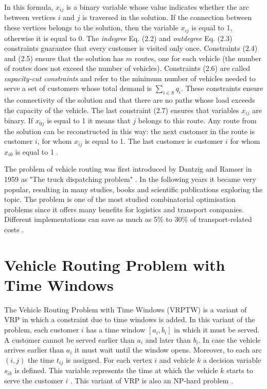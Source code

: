 \documentclass[a4paper,twoside,12pt]{book}
\begin{document}
In this formula, $x_{ij}$ is a binary variable whose value indicates whether the arc between vertices $i$ and $j$ is traversed in the solution.  
If the connection between these vertices belongs to the solution, then the variable $x_{ij}$ is equal to 1, otherwise it is equal to 0. The \textit{indegree} Eq. (2.2) and \textit{outdegree} Eq. (2.3) constraints guarantee that every customer is visited only once. Constraints (2.4) and (2.5) ensure that the solution has $m$ routes, one for each vehicle (the number of routes does not exceed the number of vehicles).
Constraints (2.6) are called \textit{capacity-cut constraints} and refer to the minimum number of vehicles needed to serve a set of customers whose total demand is $\sum_{i \in S}  q_{i}$. These constraints ensure the connectivity of the solution and that there are no paths whose load exceeds the capacity of the vehicle. The last constraint (2.7) ensures that variables $x_{ij}$ are binary. If $x_{0j}$ is equal to 1 it means that $j$ belongs to this route. Any route from the solution can be reconstructed in this way: the next customer in the route is customer $i$, for whom $x_{ij}$ is equal to 1. The last customer is customer $i$ for whom $x_{i0}$ is equal to 1 \cite{bib:book:TothAndVigo}.

The problem of vehicle routing was first introduced by Dantzig and Ramser in 1959 as "The truck dispatching problem" \cite{bib:article:TruckDispatching}. In the following years it became very popular, resulting in many studies, books and scientific publications exploring the topic. The problem is one of the most studied combinatorial optimisation problems since it offers many benefits for logistics and transport companies. Different implementations can save as much as 5\% to 30\% of transport-related costs \cite{bib:book:GeometricModellingCostSavings}.

\section{Vehicle Routing Problem with Time Windows}

The Vehicle Routing Problem with Time Windows (VRPTW) is a variant of VRP in which a constraint due to time windows is added. In this variant of the problem, each customer $i$ has a time window $[a_{i}, b_{i}]$ in which it must be served. A customer cannot be served earlier than $a_{i}$ and later than $b_{i}$. In case the vehicle arrives earlier than $a_{i}$ it must wait until the window opens. Moreover, to each arc $(i, j)$ the time $t_{ij}$ is assigned. For each vertex $i$ and vehicle $k$ a decision variable $s_{ik}$ is defined. This variable represents the time at which the vehicle $k$ starts to serve the customer $i$ \cite{bib:chapter:VRPTW}.
This variant of VRP is also an NP-hard problem \cite{bib:article:Savelsbergh}.
\end{document}
